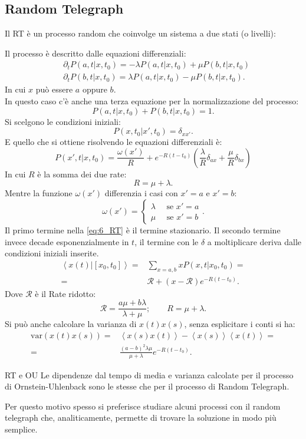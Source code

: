 \subsection{Random Telegraph}%
\label{sub:Random Telegraph}
Il RT è un processo random che coinvolge un sistema a due stati (o livelli):

Il processo è descritto dalle equazioni differenziali:
\[\begin{aligned}
    &\partial_{t}P\left(a,t|x,t_0\right) = -\lambda P\left(a,t|x,t_0\right) + \mu P\left(b,t|x,t_0\right)\\
    &\partial_{t}P\left(b,t|x,t_0\right) = \lambda P\left(a,t|x,t_0\right) - \mu P\left(b,t|x,t_0\right)
.\end{aligned}\]
In cui $x$ può essere $a$ oppure $b$.\\
In questo caso c'è anche una terza equazione per la normalizzazione del processo:
\[
    P\left(a,t|x,t_0\right)+ P\left(b,t|x,t_0\right) = 1
.\] 
Si scelgono le condizioni iniziali:
\[
    P\left(x,t_0|x',t_0\right) = \delta_{xx'}
.\] 
E quello che si ottiene risolvendo le equazioni differenziali è:
\begin{equation}
    P\left(x', t|x,t_0\right) =  \frac{\omega (x') }{R} + e^{-R (t-t_0)}\left(\frac{\lambda}{R}\delta_{ax} + \frac{\mu}{R}\delta_{bx}\right)
    \label{eq:6_RT}
\end{equation}
In cui $R$ è la somma dei due rate:
\[
    R = \mu +\lambda
.\] 
Mentre la funzione $\omega (x')$ differenzia i casi con $x'=a$ e $x'=b$:
\[
    \omega(x') =
    \begin{cases}
        \lambda  \quad \text{ se } x' = a\\
        \mu  \quad \text{ se } x' = b
    \end{cases}
.\]
Il primo termine nella \ref{eq:6_RT} è il termine stazionario. Il secondo termine invece decade esponenzialmente in $t$, il termine con le  $\delta$  a moltiplicare deriva dalle condizioni iniziali inserite.
\[\begin{aligned}
    \left<x(t) | \left[x_0,t_0\right]\right> = & \sum_{x = a,b}^{} xP\left(x,t|x_0,t_0\right) = \\
					      = &\mathcal{R} + \left(x-\mathcal{R}\right)e^{-R(t-t_0)}
.\end{aligned}\]
Dove $\mathcal{R}$ è il Rate ridotto:
\[
\mathcal{R} = \frac{ a\mu + b\lambda}{\lambda + \mu}; \qquad R = \mu + \lambda
.\] 
Si può anche calcolare la varianza di $x(t)x(s)$, senza esplicitare i conti si ha:
\[\begin{aligned}
    \text{var}(x(t) x(s) ) = & \left<x(s) x(t) \right> - \left<x(s)\right>\left<x(t) \right> = \\
			     =& \frac{\left(a-b\right)^2\lambda\mu}{\mu +\lambda}e^{-R(t-t_0) }
.\end{aligned}\]
\begin{bluebox}{RT e OU}
    Le dipendenze dal tempo di media e varianza calcolate per il processo di Ornstein-Uhlenback sono le stesse che per il processo di Random Telegraph.
\end{bluebox}
\noindent
Per questo motivo spesso si preferisce studiare alcuni processi con il random telegraph che, analiticamente, permette di trovare la soluzione in modo più semplice.
\clearpage
